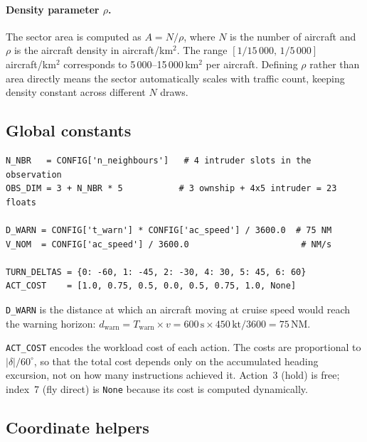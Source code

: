\documentclass[11pt, a4paper]{article}
\begin{document}
\paragraph{Density parameter $\rho$.}
The sector area is computed as $A = N / \rho$, where $N$ is the number of aircraft
and $\rho$ is the aircraft density in aircraft/km$^2$.
The range $[1/15\,000,\, 1/5\,000]$ aircraft/km$^2$ corresponds to
5\,000--15\,000\,km$^2$ per aircraft.
Defining $\rho$ rather than area directly means the sector automatically scales
with traffic count, keeping density constant across different $N$ draws.

\subsection{Global constants}

\begin{lstlisting}[caption={Module-level constants derived from \texttt{CONFIG}.}]
N_NBR   = CONFIG['n_neighbours']   # 4 intruder slots in the observation
OBS_DIM = 3 + N_NBR * 5           # 3 ownship + 4x5 intruder = 23 floats

D_WARN = CONFIG['t_warn'] * CONFIG['ac_speed'] / 3600.0  # 75 NM
V_NOM  = CONFIG['ac_speed'] / 3600.0                      # NM/s

TURN_DELTAS = {0: -60, 1: -45, 2: -30, 4: 30, 5: 45, 6: 60}
ACT_COST    = [1.0, 0.75, 0.5, 0.0, 0.5, 0.75, 1.0, None]
\end{lstlisting}

\texttt{D\_WARN} is the distance at which an aircraft moving at cruise speed
would reach the warning horizon: $d_\text{warn} = T_\text{warn} \times v = 600\,\text{s}
\times 450\,\text{kt} / 3600 = 75\,\text{NM}$.

\texttt{ACT\_COST} encodes the workload cost of each action.
The costs are proportional to $|\delta|/60^\circ$, so that the total cost depends
only on the accumulated heading excursion, not on how many instructions achieved it.
Action~3 (hold) is free; index~7 (fly direct) is \texttt{None} because its cost
is computed dynamically.

\subsection{Coordinate helpers}
\end{document}
